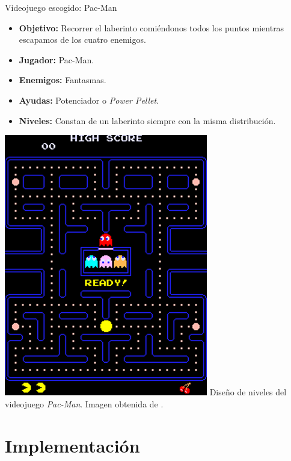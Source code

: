 \documentclass{beamer}
\begin{document}
\begin{frame}{Videojuego escogido: Pac-Man \scriptsize{\hfill \secname}}
    \begin{multicols}{2}
    
        \begin{itemize}
            \item \textbf{Objetivo:} Recorrer el laberinto comiéndonos todos los puntos mientras escapamos de los cuatro enemigos.
            \item \textbf{Jugador:} Pac-Man.
            \item \textbf{Enemigos:} Fantasmas.
            \item \textbf{Ayudas:} Potenciador o \textit{Power Pellet}.
            \item \textbf{Niveles:} Constan de un laberinto siempre con la misma distribución.
        \end{itemize}
        
        \begin{center}
            \includegraphics[scale=0.375]{img/lvl1.png}
            \scriptsize{Diseño de niveles del videojuego \textit{Pac-Man}. Imagen obtenida de \cite{pittman2015}.}
        \end{center}
        
        
        \end{multicols}
\end{frame}


\section{Implementación}
\end{document}
